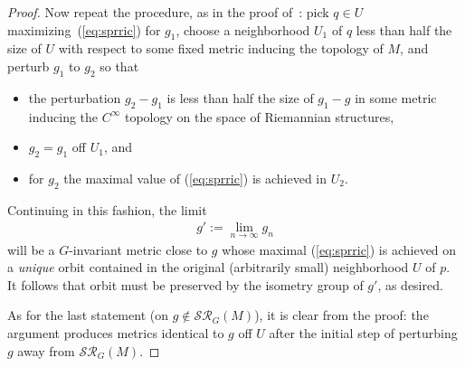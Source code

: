 \documentclass[10pt,a4paper]{amsart}
\numberwithin{equation}{section}
\begin{document}
\begin{proof}
 Now repeat the procedure, as in the proof of~\cite[Proposition~8.3]{eb}: pick $q\in U$ maximizing~(\ref{eq:sprric}) for $g_1$, choose a neighborhood $U_1$ of $q$ less than half the size of $U$ with respect to some fixed metric inducing the topology of $M$, and perturb $g_1$ to $g_2$ so that
 \begin{itemize}\itemsep=0pt
 \item the perturbation $g_2-g_1$ is less than half the size of $g_1-g$ in some metric inducing the $C^{\infty}$ topology on the space of Riemannian structures,
 \item $g_2=g_1$ off $U_1$, and
 \item for $g_2$ the maximal value of (\ref{eq:sprric}) is achieved in $U_2$.
 \end{itemize}
 Continuing in this fashion, the limit
 \begin{gather*}
 g':=\lim_{n\to\infty}g_n
 \end{gather*}
 will be a $G$-invariant metric close to $g$ whose maximal (\ref{eq:sprric}) is achieved on a {\it unique} orbit contained in the original (arbitrarily small) neighborhood $U$ of $p$. It follows that orbit must be preserved by the isometry group of $g'$, as desired.

As for the last statement (on $g\not\in \mathcal{SR}_G(M)$), it is clear from the proof: the argument produces metrics identical to $g$ off $U$ after the initial step of perturbing $g$ away from $\mathcal{SR}_G(M)$.
\end{proof}
\end{document}

